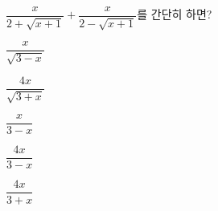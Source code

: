 \hspace*{2mm}\begin{minipage}[t]{\dimexpr\linewidth-2mm\relax}\vspace{0pt}
$\dfrac{x}{2+\sqrt{x+1}}+\dfrac{x}{2-\sqrt{x+1}}$를 간단히 하면?
\begin{choices32}{\rule[-3ex]{0pt}{8ex}$\dfrac{x}{\sqrt{3-x}}$}{\rule[-3ex]{0pt}{8ex}$\dfrac{4x}{\sqrt{3+x}}$}{\rule[-3ex]{0pt}{8ex}$\dfrac{x}{3-x}$}{\rule[-3ex]{0pt}{8ex}$\dfrac{4x}{3-x}$}{\rule[-3ex]{0pt}{8ex}$\dfrac{4x}{3+x}$}\end{choices32}\end{minipage}
